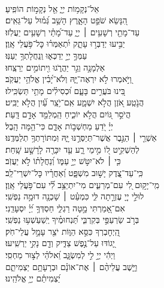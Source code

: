 \documentclass[twoside, openany, parskip=half, 11pt]{book}
\begin{document}
\\
\vspace{-1.5\baselineskip}
\begin{narrow}
%
אֵל־נְקָמ֥וֹת יְיָ֑ \hfill אֵ֖ל נְקָמ֣וֹת הוֹפִֽיעַ׃ \\
 הִ֭נָּשֵׂא שֹׁפֵ֣ט הָאָ֑רֶץ \hfill הָשֵׁ֥ב גְּ֝מ֗וּל עַל־גֵּאִֽים׃ \\
 עַד־מָתַ֖י רְשָׁעִ֥ים ׀ יְיָ֑ \hfill עַד־מָ֝תַ֗י רְשָׁעִ֥ים יַעֲלֹֽזוּ׃ \\
 יַבִּ֣יעוּ יְדַבְּר֣וּ עָתָ֑ק \hfill יִ֝תְאַמְּר֗וּ כׇּל־פֹּ֥עֲלֵי אָֽוֶן׃ \\
 עַמְּךָ֣ יְיָ֣ יְדַכְּא֑וּ \hfill וְֽנַחֲלָתְךָ֥ יְעַנּֽוּ׃ \\
 אַלְמָנָ֣ה וְגֵ֣ר יַהֲרֹ֑גוּ \hfill וִ֖יתוֹמִ֣ים יְרַצֵּֽחוּ׃ \\
 וַ֭יֹּ֣אמְרוּ לֹ֣א יִרְאֶה־יָּ֑הּ \hfill וְלֹא־יָ֝בִ֗ין אֱלֹהֵ֥י יַעֲקֹֽב׃ \\
 בִּ֭ינוּ בֹּעֲרִ֣ים בָּעָ֑ם \hfill וּ֝כְסִילִ֗ים מָתַ֥י תַּשְׂכִּֽילוּ׃ \\
 הֲנֹ֣טַֽע אֹ֭זֶן הֲלֹ֣א יִשְׁמָ֑ע \hfill אִֽם־יֹ֥צֵֽר עַ֗֝יִן הֲלֹ֣א יַבִּֽיט׃ \\
 הֲיֹסֵ֣ר גּ֭וֹיִם הֲלֹ֣א יוֹכִ֑יחַ \hfill הַֽמְלַמֵּ֖ד אָדָ֣ם דָּֽעַת׃ \\
 יְיָ֗ יֹ֭דֵעַ מַחְשְׁב֣וֹת אָדָ֑ם \hfill כִּי־הֵ֥מָּה הָֽבֶל׃ \\
 אַשְׁרֵ֤י ׀ הַגֶּ֣בֶר אֲשֶׁר־תְּיַסְּרֶ֣נּוּ יָּ֑הּ \hfill וּֽמִתּוֹרָתְךָ֥ תְלַמְּדֶֽנּוּ׃ \\
 לְהַשְׁקִ֣יט ל֭וֹ מִ֣ימֵי רָ֑ע \hfill עַ֤ד יִכָּרֶ֖ה לָרָשָׁ֣ע שָֽׁחַת׃ \\
 כִּ֤י ׀ לֹא־יִטֹּ֣שׁ יְיָ֣ עַמּ֑וֹ \hfill וְ֝נַחֲלָת֗וֹ לֹ֣א יַעֲזֹֽב׃ \\
 כִּֽי־עַד־צֶ֭דֶק יָשׁ֣וּב מִשְׁפָּ֑ט \hfill וְ֝אַחֲרָ֗יו כׇּל־יִשְׁרֵי־לֵֽב׃ \\
 מִֽי־יָק֣וּם לִ֭י עִם־מְרֵעִ֑ים \hfill מִי־יִתְיַצֵּ֥ב לִ֗֝י עִם־פֹּ֥עֲלֵי אָֽוֶן׃ \\
 לוּלֵ֣י יְיָ֭ עֶזְרָ֣תָה לִּ֑י \hfill כִּמְעַ֓ט ׀ שָׁכְנָ֖ה דוּמָ֣ה נַפְשִֽׁי׃ \\
 אִם־אָ֭מַרְתִּי מָ֣טָה רַגְלִ֑י \hfill חַסְדְּךָ֥ יְ֝יָ֗ יִסְעָדֵֽנִי׃ \\
 בְּרֹ֣ב שַׂרְעַפַּ֣י בְּקִרְבִּ֑י \hfill תַּ֝נְחוּמֶ֗יךָ יְֽשַׁעַשְׁע֥וּ נַפְשִֽׁי׃ \\
 הַֽ֭יְחׇבְרְךָ כִּסֵּ֣א הַוּ֑וֹת \hfill יֹצֵ֖ר עָמָ֣ל עֲלֵי־חֹֽק׃ \\
 יָ֭גוֹדּוּ עַל־נֶ֣פֶשׁ צַדִּ֑יק \hfill וְדָ֖ם נָקִ֣י יַרְשִֽׁיעוּ׃ \\
 וַיְהִ֬י יְיָ֣ לִ֣י לְמִשְׂגָּ֑ב \hfill וֵ֝אלֹהַ֗י לְצ֣וּר מַחְסִֽי׃ \\
 וַיָּ֤שֶׁב עֲלֵיהֶ֨ם ׀ אֶת־אוֹנָ֗ם \hfill וּבְרָעָתָ֥ם יַצְמִיתֵ֑ם\\ יַ֝צְמִיתֵ֗ם יְיָ֥ אֱלֹהֵֽינוּ׃ \hfill \break
\end{narrow}
\end{document}

